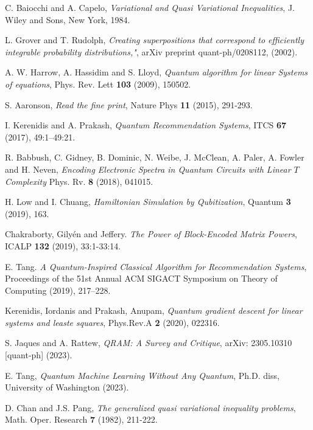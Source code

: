 \documentclass[10pt,twoside,reqno]{amsart} %
\theoremstyle{plain}
\theoremstyle{definition}
\begin{document}
\begin{thebibliography}{0}

C. Baiocchi and A. Capelo, 
{\it Variational and Quasi Variational Inequalities}, 
J. Wiley and Sons, 
New York, 
1984.

L. Grover and T. Rudolph,
{\it Creating superpositions that correspond to efficiently integrable
probability distributions,"},
arXiv preprint quant-ph/0208112, (2002).

A. W. Harrow, A. Hassidim and S. Lloyd,
{\it Quantum algorithm for linear Systems of equations},
Phys. Rev. Lett
{\bf 103} (2009),
150502.

S. Aaronson,
{\it Read the fine print},
Nature Phys
{\bf 11} (2015),
291-293.

I. Kerenidis and A. Prakash,
{\it Quantum Recommendation Systems},
ITCS
{\bf 67} (2017),
49:1--49:21.

R. Babbush, C. Gidney, B. Dominic, N. Weibe, J. McClean, A. Paler, A. Fowler
and H. Neven,
{\it Encoding Electronic Spectra in Quantum Circuits with Linear $T$ Complexity}
Phys. Rv.
{\bf 8} (2018),
041015.

H. Low and I. Chuang,
{\it Hamiltonian Simulation by Qubitization},
Quantum
{\bf 3} (2019),
163.

Chakraborty, Gily{\'en} and Jeffery. {\it The Power of Block-Encoded Matrix
Powers}, ICALP {\bf 132} (2019), 33:1-33:14.

E. Tang. {\it A Quantum-Inspired Classical Algorithm for Recommendation Systems},
Proceedings of the 51st Annual ACM SIGACT Symposium on Theory of Computing (2019),
217--228.

Kerenidis, Iordanis and Prakash, Anupam, 
{\it Quantum gradient descent for linear systems and leaste squares}, 
Phys.Rev.A {\bf 2} (2020), 
022316.

S. Jaques and A. Rattew,
{\it QRAM: A Survey and Critique},
arXiv: 2305.10310 [quant-ph] (2023).

E. Tang,
{\it Quantum Machine Learning Without Any Quantum},
Ph.D. diss, University of Washington (2023).

D. Chan and J.S. Pang, 
{\it The generalized quasi variational inequality problems}, 
Math. Oper. Research 
{\bf 7} (1982), 
211-222.


\end{thebibliography}
\end{document}
